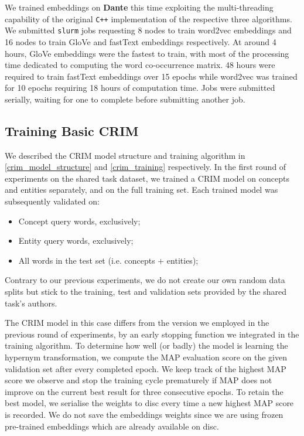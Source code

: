 We trained embeddings on \textbf{Dante} this time exploiting the multi-threading capability of the original \texttt{C++} implementation of the respective three algorithms.  We submitted \texttt{slurm} jobs requesting 8 nodes to train word2vec embeddings and 16 nodes to train GloVe and fastText embeddings respectively.  At around 4 hours, GloVe embeddings were the fastest to train, with most of the processing time dedicated to computing the word co-occurrence matrix.  48 hours were required to train fastText embeddings over 15 epochs while word2vec was trained for 10 epochs requiring 18 hours of computation time.  Jobs were submitted serially, waiting for one to complete before submitting another job.  

\subsection{Training Basic CRIM}
We described the CRIM model structure and training algorithm in \cref{crim_model_structure} and \cref{crim_training} respectively.  In the first round of experiments on the shared task dataset, we trained a CRIM model on concepts and entities separately, and on the full training set.  Each trained model was subsequently validated on:
\begin{itemize}
    \item Concept query words, exclusively;
    \item Entity query words, exclusively;
    \item All words in the test set (i.e. concepts + entities);
\end{itemize}
Contrary to our previous experiments, we do not create our own random data splits but stick to the training, test and validation sets provided by the shared task's authors.

The CRIM model in this case differs from the version we employed in the previous round of experiments, by an early stopping function we integrated in the training algorithm.  To determine how well (or badly) the model is learning the hypernym transformation, we compute the \ac{MAP} evaluation score on the given validation set after every completed epoch.  We keep track of the highest \ac{MAP} score we observe and stop the training cycle prematurely if \ac{MAP} does not improve on the current best result for three consecutive epochs.  To retain the best model, we serialise the weights to disc every time a new highest \ac{MAP} score is recorded.  We do not save the embeddings weights since we are using frozen pre-trained embeddings which are already available on disc.  

